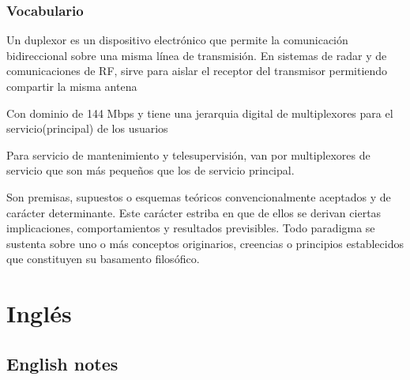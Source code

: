 \documentclass[
	12pt, %
	fleqn, %
	a4paper, %
	oneside, %
]{LegrandOrangeBook}
\begin{document}
\section*{Vocabulario}
\begin{vocabulary}[Duplexer]
Un duplexor es un dispositivo electrónico que permite la comunicación bidireccional sobre una misma línea de transmisión. En sistemas de radar y de comunicaciones de RF, sirve para aislar el receptor del transmisor permitiendo compartir la misma antena
\end{vocabulary}
\begin{vocabulary}
Con dominio de 144 Mbps y tiene una jerarquia digital de multiplexores para el servicio(principal) de los usuarios
\end{vocabulary}
\begin{vocabulary}
Para servicio de mantenimiento y telesupervisión, van por multiplexores de servicio que son más pequeños que los de servicio principal.
\end{vocabulary}
\begin{vocabulary}[Paradigma]
Son premisas, supuestos o esquemas teóricos convencionalmente aceptados y de carácter determinante. Este carácter estriba en que de ellos se derivan ciertas implicaciones, comportamientos y resultados previsibles. Todo paradigma se sustenta sobre uno o más conceptos originarios, creencias o principios establecidos que constituyen su basamento filosófico.
\end{vocabulary}
\part{Inglés}
\chapter{English notes}
\end{document}
